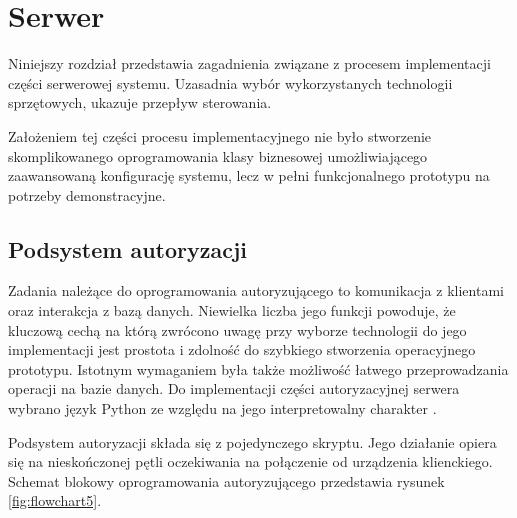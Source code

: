 \chapter{Serwer}
\label{chap:server}

    Niniejszy rozdział przedstawia zagadnienia związane z procesem implementacji części serwerowej systemu. Uzasadnia wybór wykorzystanych technologii sprzętowych, ukazuje przepływ sterowania.

    Założeniem tej części procesu implementacyjnego nie było stworzenie skomplikowanego oprogramowania klasy biznesowej umożliwiającego zaawansowaną konfigurację systemu, lecz w pełni funkcjonalnego prototypu na potrzeby demonstracyjne.

    \section{Podsystem autoryzacji}
    \label{s:auth_subs}

    	Zadania należące do oprogramowania autoryzującego to komunikacja z klientami oraz interakcja z bazą danych. Niewielka liczba jego funkcji powoduje, że kluczową cechą na którą zwrócono uwagę przy wyborze technologii do jego implementacji jest prostota i zdolność do szybkiego stworzenia operacyjnego prototypu. Istotnym wymaganiem była także możliwość łatwego przeprowadzania operacji na bazie danych. Do implementacji części autoryzacyjnej serwera wybrano język Python ze względu na jego interpretowalny charakter . 

    	Podsystem autoryzacji składa się z pojedynczego skryptu. Jego działanie opiera się na nieskończonej pętli oczekiwania na połączenie od urządzenia klienckiego. Schemat blokowy oprogramowania autoryzującego przedstawia rysunek \ref{fig:flowchart5}.

